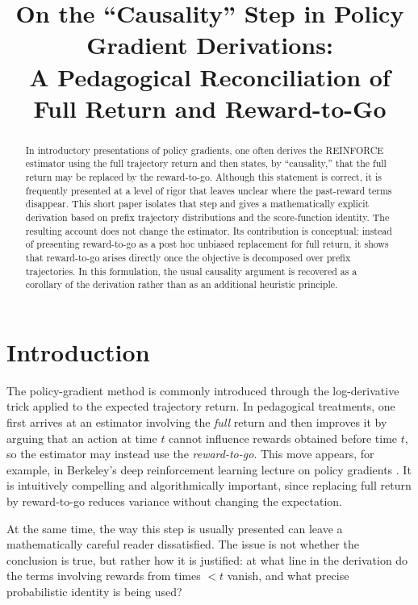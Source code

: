 \documentclass[11pt]{article}
\title{On the ``Causality'' Step in Policy Gradient Derivations: \\
A Pedagogical Reconciliation of Full Return and Reward-to-Go}
\author{}
\date{}
\begin{document}
\maketitle

\begin{abstract}
In introductory presentations of policy gradients, one often derives the REINFORCE estimator using the full trajectory return and then states, by ``causality,'' that the full return may be replaced by the reward-to-go. Although this statement is correct, it is frequently presented at a level of rigor that leaves unclear where the past-reward terms disappear. This short paper isolates that step and gives a mathematically explicit derivation based on prefix trajectory distributions and the score-function identity. The resulting account does not change the estimator. Its contribution is conceptual: instead of presenting reward-to-go as a post hoc unbiased replacement for full return, it shows that reward-to-go arises directly once the objective is decomposed over prefix trajectories. In this formulation, the usual causality argument is recovered as a corollary of the derivation rather than as an additional heuristic principle.
\end{abstract}

\section{Introduction}
The policy-gradient method is commonly introduced through the log-derivative trick applied to the expected trajectory return. In pedagogical treatments, one first arrives at an estimator involving the \emph{full} return and then improves it by arguing that an action at time $t$ cannot influence rewards obtained before time $t$, so the estimator may instead use the \emph{reward-to-go}. This move appears, for example, in Berkeley's deep reinforcement learning lecture on policy gradients \cite{berkeley}. It is intuitively compelling and algorithmically important, since replacing full return by reward-to-go reduces variance without changing the expectation.

At the same time, the way this step is usually presented can leave a mathematically careful reader dissatisfied. The issue is not whether the conclusion is true, but rather how it is justified: at what line in the derivation do the terms involving rewards from times $< t$ vanish, and what precise probabilistic identity is being used?
\end{document}
